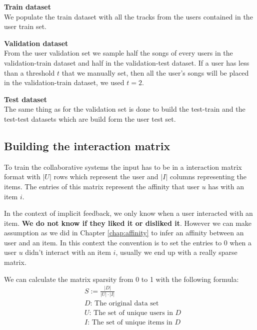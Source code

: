 \textbf{Train dataset}\\
We populate the train dataset with all the tracks from the users contained in the user train set.

\textbf{Validation dataset}\\
From the user validation set we sample half the songs of every users in the validation-train dataset and half in the validation-test dataset. If a user has less than a threshold $t$ that we manually set, then all the user's songs will be placed in the validation-train dataset, we used $t = 2$.

\textbf{Test dataset}\\
The same thing as for the validation set is done to build the test-train and the test-test datasets which are build form the user test set.

\newpage

\subsection{Building the interaction matrix} \label{subsec:r_matrix}
To train the collaborative systems the input has to be in a interaction matrix format with $|U|$ rows which represent the user and $|I|$ columns representing the items. The entries of this matrix represent the affinity that user $u$ has with an item $i$.

In the context of implicit feedback, we only know when a user interacted with an item. \textbf{We do not know if they liked it or disliked it}. However we can make assumption as we did in Chapter \ref{chap:affinity} to infer an affinity between an user and an item. In this context the convention is to set the entries to 0 when a user $u$ didn't interact with an item $i$, usually we end up with a really sparse matrix.

We can calculate the matrix sparsity from 0 to 1 with the following formula: \\
\begin{align*}
    &S := \frac{|D|}{|U| \cdot |I|}\\
    &D\text{: The original data set}\\
    &U\text{: The set of unique users in }D\\
    &I\text{: The set of unique items in }D
\end{align*}

